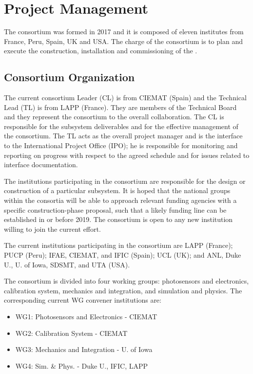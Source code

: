 \section{Project Management}
\label{sec:dp-pds-management}

The \dual {} consortium was formed in 2017 and it is composed of eleven institutes from France, Peru, Spain, UK and USA. The charge of the \dual {} consortium is to plan and execute the construction, installation and commissioning of the  .

\subsection{Consortium Organization}

The current \dual {} consortium Leader (CL) is %
 from CIEMAT (Spain) and the Technical Lead (TL) is %
 from LAPP (France). They are members of the  Technical Board and they represent the consortium to the overall  collaboration. The CL is responsible for the subsystem deliverables and for the effective management of the consortium. The TL acts as the overall project manager and is the interface to the International Project Office (IPO); he is responsible for monitoring and reporting on progress with respect to the agreed schedule and for issues related to interface documentation.

The institutions participating in the consortium are responsible for the design or construction of a particular subsystem. It is hoped that the national groups within the consortia will be able to approach relevant funding agencies with a specific construction-phase proposal, such that a likely funding line can be established in or before 2019. The \dual {} consortium is open to any new institution willing to join the current effort.

The current institutions participating in the \dual {} consortium are LAPP (France); PUCP (Peru); IFAE, CIEMAT, and IFIC (Spain); UCL (UK); and ANL, Duke U., U. of Iowa, SDSMT, and UTA (USA).

The \dual {} consortium is divided into four working groups: photosensors and electronics, calibration system, mechanics and integration, and simulation and physics. The corresponding current WG convener institutions are:
\begin{itemize}
\item WG1: Photosensors and Electronics -  CIEMAT %
\item WG2: Calibration System -  CIEMAT %
\item WG3: Mechanics and Integration - U. of Iowa %
\item WG4: Sim. \& Phys. - %
Duke U., %
IFIC, %
LAPP
\end{itemize}

